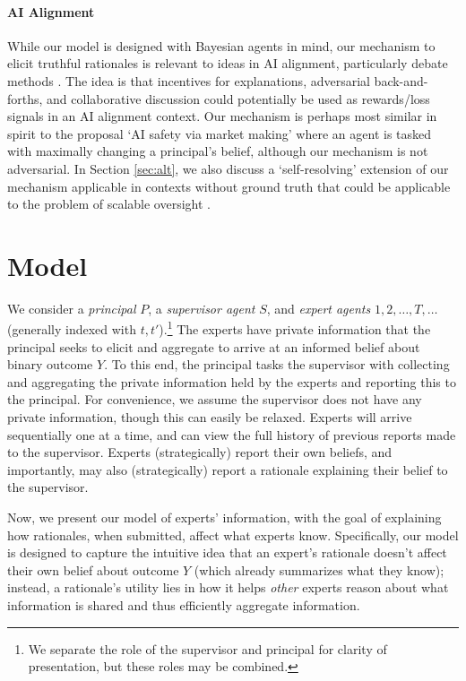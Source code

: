 \documentclass{winnower}
\begin{document}
\paragraph{AI Alignment}
While our model is designed with Bayesian agents in mind, our mechanism to elicit truthful rationales is relevant to ideas in AI alignment, particularly debate methods \citep{khan2024debating, michael2023debate, irving2018ai}. The idea is that incentives for explanations, adversarial back-and-forths, and collaborative discussion could potentially be used as rewards/loss signals in an AI alignment context. Our mechanism is perhaps most similar in spirit to the proposal `AI safety via market making' \citep{hubinger2020ai} where an agent is tasked with maximally changing a principal's belief, although our mechanism is not adversarial. In Section \ref{sec:alt}, we also discuss a `self-resolving' extension of our mechanism applicable in contexts without ground truth that could be applicable to the problem of scalable oversight \citep{bowman2022measuring}.


\section{Model} \label{sec:model}

We consider a \emph{principal} $P$, a \emph{supervisor agent} $S$, and \emph{expert agents} $1, 2, \ldots, T, \ldots$ (generally indexed with $t, t'$).\footnote{We separate the role of the supervisor and principal for clarity of presentation, but these roles may be combined.} The experts have private information that the principal seeks to elicit and aggregate to arrive at an informed belief about binary outcome $Y$. To this end, the principal tasks the supervisor with collecting and aggregating the private information held by the experts and reporting this to the principal. For convenience, we assume the supervisor does not have any private information, though this can easily be relaxed. Experts will arrive sequentially one at a time, and can view the full history of previous reports made to the supervisor. Experts (strategically) report their own beliefs, and importantly, may also (strategically) report a rationale explaining their belief to the supervisor. 

Now, we present our model of experts' information, with the goal of explaining how rationales, when submitted, affect what experts know. Specifically, our model is designed to capture the intuitive idea that an expert's rationale doesn't affect their own belief about outcome $Y$ (which already summarizes what they know); instead, a rationale's utility lies in how it helps \emph{other} experts reason about what information is shared and thus efficiently aggregate information.
\end{document}
